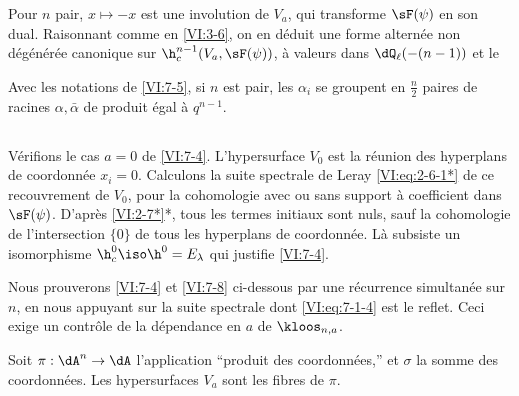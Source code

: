 Pour $n$ pair, $x\mapsto -x$ est une involution de $V_a$, qui transforme 
$\sF(\psi)$ en son dual. Raisonnant comme en \ref{VI:3-6}, on en déduit une 
forme alternée non dégénérée canonique sur $\h_c^{n-1}(V_a,\sF(\psi))$, 
à valeurs dans $\dQ_\ell(-(n-1))$ et le 





\begin{corollary_}\label{VI:7-6}
Avec les notations de \ref{VI:7-5}, si $n$ est pair, les $\alpha_i$ se groupent 
en $\frac n 2$ paires de racines $\alpha,\bar\alpha$ de produit égal à 
$q^{n-1}$. 
\end{corollary_}





\subsection{}\label{VI:7-7}

Vérifions le cas $a=0$ de \ref{VI:7-4}. L'hypersurface $V_0$ est la réunion 
des hyperplans de coordonnée $x_i=0$. Calculons la suite spectrale de Leray 
\eqref{VI:eq:2-6-1*} de ce recouvrement de $V_0$, pour la cohomologie avec ou 
sans support à coefficient dans $\sF(\psi)$. D'après \ref{VI:2-7*}*, tous 
les termes initiaux sont nuls, sauf la cohomologie de l'intersection $\{0\}$ de 
tous les hyperplans de coordonnée. Là subsiste un isomorphisme 
$\h_c^0{}\iso \h^0{}=E_\lambda$ qui justifie \ref{VI:7-4}. 

Nous prouverons \ref{VI:7-4} et \ref{VI:7-8} ci-dessous par une récurrence 
simultanée sur $n$, en nous appuyant sur la suite spectrale dont 
\eqref{VI:eq:7-1-4} est le reflet. Ceci exige un contrôle de la dépendance 
en $a$ de $\kloos_{n,a}$. 

Soit $\pi:\dA^n \to \dA$ l'application ``produit des coordonnées,'' et 
$\sigma$ la somme des coordonnées. Les hypersurfaces $V_a$ sont les fibres de 
$\pi$. 





